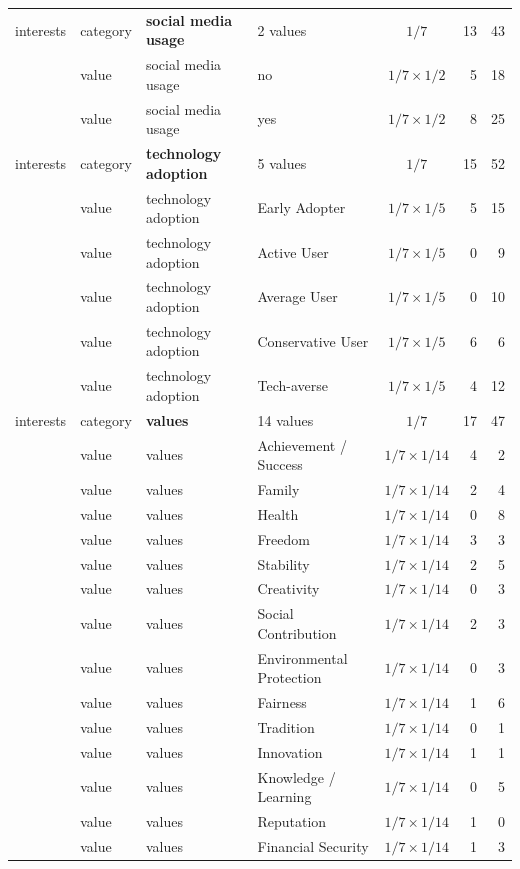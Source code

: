 \documentclass{ieeeaccess}
\begin{document}
\begin{table}[H]
\begin{tabularx}{\textwidth}{l l l X c r r}
interests & category & \textbf{social media usage} & 2 values & $1/7$ & 13 & 43 \\
 & value & social media usage & no & $1/7\times1/2$ & 5 & 18 \\
 & value & social media usage & yes & $1/7\times1/2$ & 8 & 25 \\
interests & category & \textbf{technology adoption} & 5 values & $1/7$ & 15 & 52 \\
 & value & technology adoption & Early Adopter & $1/7\times1/5$ & 5 & 15 \\
 & value & technology adoption & Active User & $1/7\times1/5$ & 0 & 9 \\
 & value & technology adoption & Average User & $1/7\times1/5$ & 0 & 10 \\
 & value & technology adoption & Conservative User & $1/7\times1/5$ & 6 & 6 \\
 & value & technology adoption & Tech-averse & $1/7\times1/5$ & 4 & 12 \\
interests & category & \textbf{values} & 14 values & $1/7$ & 17 & 47 \\
 & value & values & Achievement / Success & $1/7\times1/14$ & 4 & 2 \\
 & value & values & Family & $1/7\times1/14$ & 2 & 4 \\
 & value & values & Health & $1/7\times1/14$ & 0 & 8 \\
 & value & values & Freedom & $1/7\times1/14$ & 3 & 3 \\
 & value & values & Stability & $1/7\times1/14$ & 2 & 5 \\
 & value & values & Creativity & $1/7\times1/14$ & 0 & 3 \\
 & value & values & Social Contribution & $1/7\times1/14$ & 2 & 3 \\
 & value & values & Environmental Protection & $1/7\times1/14$ & 0 & 3 \\
 & value & values & Fairness & $1/7\times1/14$ & 1 & 6 \\
 & value & values & Tradition & $1/7\times1/14$ & 0 & 1 \\
 & value & values & Innovation & $1/7\times1/14$ & 1 & 1 \\
 & value & values & Knowledge / Learning & $1/7\times1/14$ & 0 & 5 \\
 & value & values & Reputation & $1/7\times1/14$ & 1 & 0 \\
 & value & values & Financial Security & $1/7\times1/14$ & 1 & 3 \\
\bottomrule
\end{tabularx}
\end{table}
\end{document}
